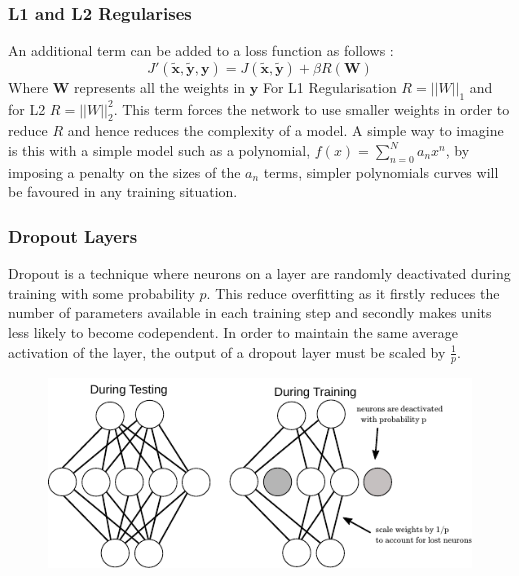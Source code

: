     \subsubsection{L1 and L2 Regularises}
      An additional term can be added to a loss function as follows \cite{Ng2004a}:
      \begin{equation}
        J'(\tilde{\mathbf{x}},\tilde{\mathbf{y}},\mathbf{y}) = J(\tilde{\mathbf{x}},\tilde{\mathbf{y}}) + \beta R(\mathbf{W})
      \end{equation}
      Where $\mathbf{W}$ represents all the weights in $\mathbf{y}$ For L1 Regularisation $R = ||W||_1$ and for L2 $R = ||W||_2^2$.
      This term forces the network to use smaller weights in order to reduce $R$
      and hence reduces the complexity of a model. A simple way to imagine is this
      with a simple model such as a polynomial, $f(x)=\sum_{n=0}^N a_n x^n$, by imposing a
      penalty on the sizes of the $a_n$ terms, simpler polynomials curves will be favoured in
      any training situation.
    \subsubsection{Dropout Layers} \label{sec:dropout}
      Dropout \cite{Srivastava2014} is a technique where neurons on a layer are
      randomly deactivated during training with some probability $p$. This reduce overfitting
      as it firstly reduces the number of parameters available in each training step and secondly
      makes units less likely to become codependent. In order to maintain the same average activation
      of the layer, the output of a dropout layer must be scaled by $\frac{1}{p}$.

      \begin{figure}[h!]
       \centering
       \includegraphics[width=\textwidth]{illustrations/dropout.pdf}
      \end{figure}

